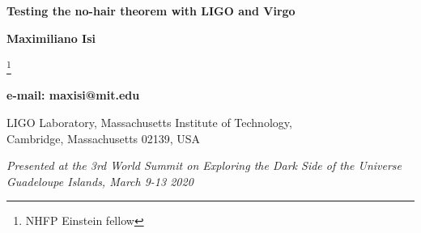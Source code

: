 \documentclass[letterpaper]{article}
\begin{document}
\vspace*{1.2cm}



\thispagestyle{empty}
\begin{center}

{\LARGE \bf Testing the no-hair theorem with LIGO and Virgo}


\par\vspace*{7mm}\par

{

\bigskip

\large \bf Maximiliano Isi}
\footnote{NHFP Einstein fellow}


\bigskip


{\large \bf  e-mail: maxisi@mit.edu}

\bigskip

{ LIGO Laboratory, Massachusetts Institute of Technology,\\Cambridge, Massachusetts 02139, USA}

\bigskip

{\it Presented at the 3rd World Summit on Exploring the Dark Side of the Universe \\Guadeloupe Islands, March 9-13 2020}

\end{center}





\begin{abstract}
The no-hair theorem predicts that a perturbed Kerr black hole should emit gravitational waves as damped sinusoids with characteristic frequencies and damping rates depending only on the hole's mass and spin.
Analyzing the spectrum of such quasinormal modes can provide a direct probe of the black-hole spacetime, distinguishing it from other compact objects and enabling tests of general relativity.
Considering the two least-damped components of the dominant angular mode ($\ell=m=2$, $n \leq 1$), we find that the first LIGO detection (GW150914) already encoded clues about the black-hole spectrum.
A two-mode ringdown model allows us to measure the final mass and spin of the remnant exclusively from postinspiral data, obtaining an estimate in agreement with that from the full signal.
We also find that an independent measurement of the frequency of the second mode yields agreement with the no-hair hypothesis at the ${\sim}20\%$ level.
Improved detectors on the ground, as well as future missions in space, will provide even stronger tests.
\emph{This is a summary of Isi, Giesler, Farr, Scheel, and Teukolsky (2020) \cite{Isi:2019aib}.}
\end{abstract}
  
\end{document}
